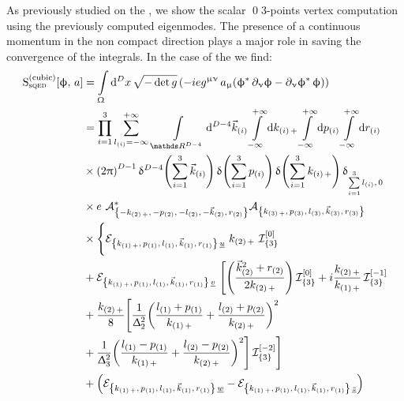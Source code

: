 As previously studied on the \nbo, we show the scalar \qed 3-points vertex computation using the previously computed eigenmodes.
The presence of a continuous momentum in the non compact direction plays a major role in saving the convergence of the integrals.
In the case of the \gnbo we find:
\begin{equation}
  \begin{split}
    \rS_{\text{s}\qed}^{(\text{cubic})}\qty[\phi,\, a]
    & =
    \int\limits_{\Omega} \dd[D]{x} \sqrt{-\det g}\,
    \qty(%
      - i e g^{\mu\nu}\,
      a_{\mu}
      \qty( \phi^*\, \ipd{\nu} \phi - \ipd{\nu} \phi^*\, \phi )
    )
    \\
    & =
    \finiteprod{i}{1}{3}
    \infinfsum{l_{\qty(i)}}\,
    \int\limits_{\R^{D-4}} \dd[D-4]{\vec{k}_{\qty(i)}}
    \infinfint{k_{\qty(i)\, +}}
    \infinfint{p_{(i)}}
    \infinfint{r_{(i)}}
    \\
    & \times
    \qty( 2 \pi )^{D-1}\,
    \delta^{D-4}\qty( \finitesum{i}{1}{3} \vec{k}_{\qty(i)} )\,
    \delta\qty( \finitesum{i}{1}{3} p_{(i)} )\,
    \delta\qty( \finitesum{i}{1}{3} k_{\qty(i)\, +} )\,
    \delta_{\finitesum{i}{1}{3} l_{(i)},\, 0}
    \\
    & \times
    e~
    \cA^*_{\mkmkrgenN{2}}
    \cA_{\kmkrgenN{3}}
    \\
    & \times
    \Biggl\lbrace
      \cE_{\kmkrgenN{1}\, \underu}~
      k_{\qty(2)\, +}~
      \cI_{\qty{3}}^{\qty[0]}
      \\
      & +
      \cE_{\kmkrgenN{1}\, \underv}~
      \Biggl[
        \qty( \frac{\vec{k}_{\qty(2)}^2 + r_{(2)}}{2 k_{\qty(2)\, +}} )\,
        \cI_{\qty{3}}^{\qty[0]}
        +
        i \frac{k_{\qty(2)\, +}}{k_{\qty(1)\, +}}\,
        \cI_{\qty{3}}^{\qty[-1]}
        \\
        & +
        \frac{k_{\qty(2)\, +}}{8}
        \Biggl[%
            \frac{1}{\Delta_2^2}
            \qty(%
              \frac{l_{(1)} + p_{(1)}}{k_{\qty(1)\, +}}
              +
              \frac{l_{(2)} + p_{(2)}}{k_{\qty(2)\, +}}
            )^2
            \\
            & +
            \frac{1}{\Delta_3^2}
            \qty(%
              \frac{l_{(1)} - p_{(1)}}{k_{\qty(1)\, +}}
              +
              \frac{l_{(2)} - p_{(2)}}{k_{\qty(2)\, +}}
            )^2
        \Biggr]\,
        \cI_{\qty{3}}^{\qty[-2]}
      \Biggr]
      \\
      & +
      \qty( \cE_{\kmkrgenN{1}\, \underw} - \cE_{\kmkrgenN{1}\, \underz} )
      \\

\end{split}
\end{equation}
